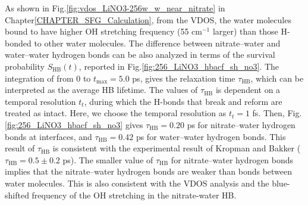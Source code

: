 As shown in Fig.\thinspace\ref{fig:vdos_LiNO3-256w_w_near_nitrate} in Chapter\thinspace\ref{CHAPTER_SFG_Calculation}, 
from the VDOS, the water molecules bound to \nitrate have higher OH stretching frequency (55 cm$^{-1}$ larger) 
than those H-bonded to other water molecules. 
%
The difference between nitrate--water and water--water hydrogen bonds 
can be also analyzed in terms of the survival probability $S_{\text{HB}}(t)$, \cite{AKS86,JT90,AL96} 
reported in Fig.\thinspace\ref {fig:256_LiNO3_hbacf_sh_no3}.
The integration of \SHB from 0 to $t_{\max}=5.0$ ps, \cite{Steinel2004} gives the relaxation time $\tau_\text{HB}$, which can be interpreted as 
the average HB lifetime. \cite{SC02} 
The values of $\tau_{\text{HB}}$ is dependent on a temporal resolution $t_t$, during which the H-bonds that break and reform are treated as intact. \cite{AL00} 
%
Here, we choose the temporal resolution as $t_t=1$ fs. 
Then, Fig.\thinspace\ref {fig:256_LiNO3_hbacf_sh_no3} gives $\tau_\text{HB}=0.20$ ps for nitrate--water hydrogen bonds at interfaces, and $\tau_\text{HB}=0.42$ ps for water--water hydrogen bonds.
This result of $\tau_\text{HB}$ is consistent with the experimental result of Kropman and Bakker ($\tau_\text{HB}=0.5\pm0.2$ ps). \cite{MFK01}
The smaller value of $\tau_\text{HB}$ for nitrate--water hydrogen bonds implies that the nitrate--water hydrogen bonds are weaker than bonds between water molecules. 
This is also consistent with the VDOS analysis and the blue-shifted frequency of the OH stretching in the nitrate-water HB. 

\FloatBarrier
